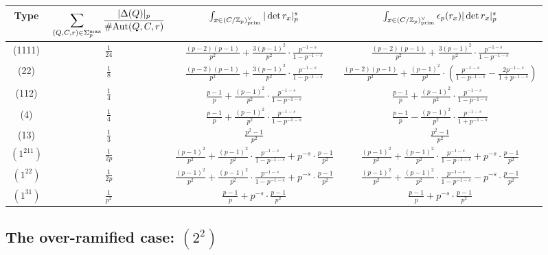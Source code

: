 \documentclass{article}
\def\Z{{\mathbb Z}}
\def\Aut{{\rm Aut}}
\def\prim{{\rm prim}}
\def\Z{{\mathbb Z}}
\begin{document}
\begin{table}[h]
\centering
\hspace*{-0.5cm}
 \begin{tabular}{|c|c|c|c|}
  \hline
  \textbf{\textrm{Type}} & $\displaystyle\sum_{(Q,C,r)\in\Sigma^{\max}_p}\frac{|\Delta(Q)|_p}{\#\Aut(Q,C,r)}$ &   $\int_{x\in (C/\Z_p)^{\vee}_{\prim}}  |\det{r_x}|_p^{s}$ & $\int_{x\in (C/\Z_p)^{\vee}_{\prim}}  \epsilon_p(r_x)|\det{r_x}|_p^{s}$  \\
  \hline
  (1111)&$\frac{1}{24}$&$\frac{(p-2)(p-1)}{p^2}+\frac{3(p-1)^2}{p^2}\cdot\frac{p^{-1-s}}{1-p^{-1-s}}$&$\frac{(p-2)(p-1)}{p^2}+\frac{3(p-1)^2}{p^2}\cdot\frac{p^{-1-s}}{1-p^{-1-s}}$ \\
    \hline
    (22)&$\frac18$&$\frac{(p-2)(p-1)}{p^2}+\frac{3(p-1)^2}{p^2}\cdot\frac{p^{-1-s}}{1-p^{-1-s}}$&$\frac{(p-2)(p-1)}{p^2}+\frac{(p-1)^2}{p^2}\cdot\left(\frac{p^{-1-s}}{1-p^{-1-s}}-\frac{2p^{-1-s}}{1+p^{-1-s}}\right)$\\
\hline
  (112)&$\frac14$&$\frac{p-1}{p} + \frac{(p-1)^2}{p^2}\cdot\frac{p^{-1-s}}{1-p^{-1-s}}$&$\frac{p-1}{p} + \frac{(p-1)^2}{p^2}\cdot\frac{p^{-1-s}}{1-p^{-1-s}}$\\
    \hline
   (4)&$\frac14$&$\frac{p-1}{p} + \frac{(p-1)^2}{p^2}\cdot\frac{p^{-1-s}}{1-p^{-1-s}}$&$\frac{p-1}{p} - \frac{(p-1)^2}{p^2}\cdot\frac{p^{-1-s}}{1+p^{-1-s}}$\\
   \hline
   (13)&$\frac13$&$\frac{p^2-1}{p^2}$&$\frac{p^2-1}{p^2}$\\
   \hline
   $(1^211)$&$\frac{1}{2p}$ &$\frac{(p-1)^2}{p^2}+\frac{(p-1)^2}{p^2}\cdot\frac{p^{-1-s}}{1-p^{-1-s}}+p^{-s}\cdot\frac{p-1}{p^2}$&$\frac{(p-1)^2}{p^2}+\frac{(p-1)^2}{p^2}\cdot\frac{p^{-1-s}}{1-p^{-1-s}}+p^{-s}\cdot\frac{p-1}{p^2}$\\
   \hline
   $(1^22)$&$\frac{1}{2p}$ &$\frac{(p-1)^2}{p^2}+\frac{(p-1)^2}{p^2}\cdot\frac{p^{-1-s}}{1-p^{-1-s}}+p^{-s}\cdot\frac{p-1}{p^2}$&$\frac{(p-1)^2}{p^2}+\frac{(p-1)^2}{p^2}\cdot\frac{p^{-1-s}}{1-p^{-1-s}}-p^{-s}\cdot\frac{p-1}{p^2}$\\
   \hline
   $(1^31)$& $\frac{1}{p^2}$& $\frac{p-1}{p}+p^{-s}\cdot \frac{p-1}{p^2}$&$\frac{p-1}{p}+p^{-s}\cdot \frac{p-1}{p^2}$ \\
   \hline
\end{tabular}
\end{table}

\subsection{The over-ramified case: $(2^2)$}
\end{document}
